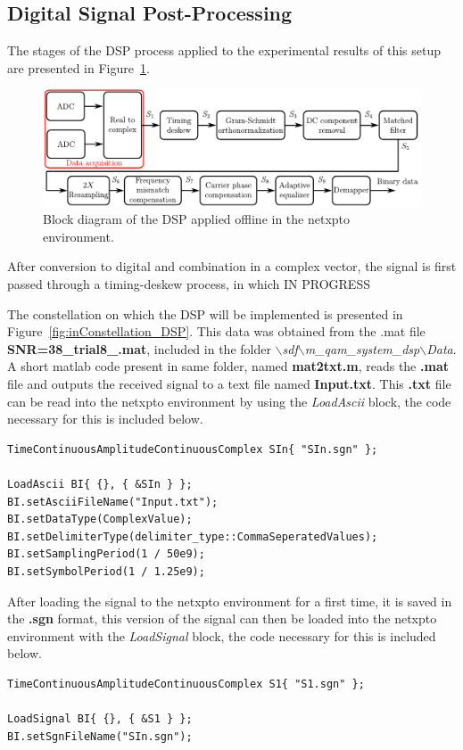 

\clearpage
\subsection{Digital Signal Post-Processing}
The stages of the DSP process applied to the experimental results of this setup are presented in Figure~\ref{fig:mqamDiagramDSP}. 	
%
\begin{figure}[h]
\centering
\includegraphics[width=\linewidth]{./sdf/m_qam_system/figures/DSP_section/diagramDSP}
\caption{Block diagram of the DSP applied offline in the netxpto environment.}
\label{fig:mqamDiagramDSP}
\end{figure}
%
After conversion to digital and combination in a complex vector, the signal is first passed through a timing-deskew process, in which IN PROGRESS
\par
%
The constellation on which the DSP will be implemented is presented in Figure~\ref{fig:inConstellation_DSP}. This data was obtained from the .mat file  \textbf{SNR=38\_trial8\_.mat}, included in the folder \textit{$\backslash$sdf$\backslash$m\_qam\_system\_dsp$\backslash$Data}. A short matlab code present in same folder, named \textbf{mat2txt.m}, reads the \textbf{.mat} file and outputs the received signal to a text file named \textbf{Input.txt}. This \textbf{.txt} file can be read into the netxpto environment by using the \textit{LoadAscii} block, the code necessary for this is included below.
\begin{verbatim}
TimeContinuousAmplitudeContinuousComplex SIn{ "SIn.sgn" };

LoadAscii BI{ {}, { &SIn } };
BI.setAsciiFileName("Input.txt");
BI.setDataType(ComplexValue);
BI.setDelimiterType(delimiter_type::CommaSeperatedValues);
BI.setSamplingPeriod(1 / 50e9);
BI.setSymbolPeriod(1 / 1.25e9);
\end{verbatim}
After loading the signal to the netxpto environment for a first time, it is saved in the \textbf{.sgn} format, this version of the signal can then be loaded into the netxpto environment with the \textit{LoadSignal} block, the code necessary for this is included below.
\begin{verbatim}
TimeContinuousAmplitudeContinuousComplex S1{ "S1.sgn" };

LoadSignal BI{ {}, { &S1 } };
BI.setSgnFileName("SIn.sgn");
\end{verbatim}

